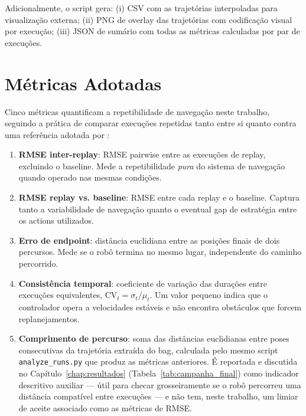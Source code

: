 Adicionalmente, o script gera: (i) CSV com as trajetórias interpoladas para
visualização externa; (ii) PNG de overlay das trajetórias com codificação visual
por execução; (iii) JSON de sumário com todas as métricas calculadas por par de
execuções.

\section{Métricas Adotadas}
\label{sec:metricas}

Cinco métricas quantificam a repetibilidade de navegação neste trabalho, seguindo a
prática de comparar execuções repetidas tanto entre si quanto contra uma referência
adotada por :

\begin{enumerate}
    \item \textbf{RMSE inter-replay}: RMSE pairwise entre as execuções de replay,
    excluindo o baseline. Mede a repetibilidade \textit{pura} do sistema de
    navegação quando operado nas mesmas condições.

    \item \textbf{RMSE replay vs. baseline}: RMSE entre cada replay e o baseline.
    Captura tanto a variabilidade de navegação quanto o eventual gap de estratégia
    entre os actions utilizados.

    \item \textbf{Erro de endpoint}: distância euclidiana entre as posições finais
    de dois percursos. Mede se o robô termina no mesmo lugar, independente do
    caminho percorrido.

    \item \textbf{Consistência temporal}: coeficiente de variação das durações entre
    execuções equivalentes, $\text{CV}_t = \sigma_t / \mu_t$. Um valor pequeno indica que o controlador opera a velocidades
    estáveis e não encontra obstáculos que forcem replanejamentos.

    \item \textbf{Comprimento de percurso}: soma das distâncias euclidianas entre
    poses consecutivas da trajetória extraída do bag, calculada pelo mesmo script
    \texttt{analyze\_\allowbreak runs.py} que produz as métricas anteriores. É
    reportada e discutida no Capítulo~\ref{chap:resultados}
    (Tabela~\ref{tab:campanha_final}) como
    indicador descritivo auxiliar --- útil para checar grosseiramente se o robô
    percorreu uma distância compatível entre execuções --- e não tem, neste
    trabalho, um limiar de aceite associado como as métricas de RMSE.
\end{enumerate}


